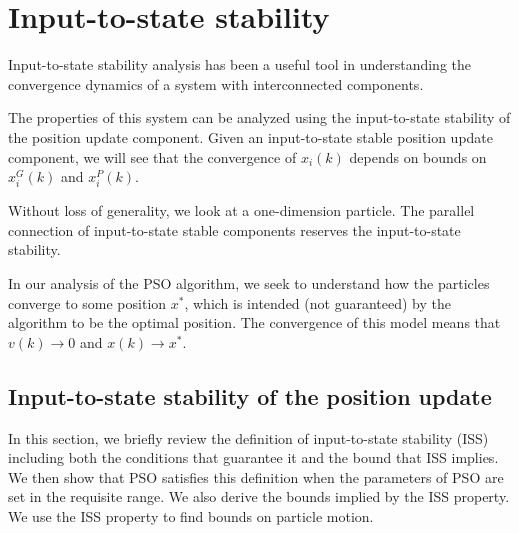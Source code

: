 \section{Input-to-state stability}
\label{sec:iss}


Input-to-state stability analysis has been a useful tool in understanding the convergence dynamics of a system with interconnected components.

The properties of this system can be analyzed using the input-to-state stability of the position update component. 
Given an input-to-state stable position update component, we will see that the convergence of $ x_{i}(k) $ depends on bounds on $ x^{G}_{i}(k) $ and $ x^{P}_{i}(k) $.

Without loss of generality, we look at a one-dimension particle.
The parallel connection of input-to-state stable components reserves the input-to-state stability.

In our analysis of the PSO algorithm, we seek to understand how the particles converge to some position $ x^{*} $, which is intended (not guaranteed) by the algorithm to be the optimal position.
The convergence of this model means that $ v(k) \rightarrow 0 $ and $ x(k) \rightarrow x^{*} $.

\subsection{Input-to-state stability of the position update}

In this section, we briefly review the definition of input-to-state stability (ISS) including both the conditions that guarantee it and the bound that ISS implies\cite{Jiang2001857}. 
We then show that PSO satisfies this definition when the parameters of PSO are set in the requisite range.
We also derive the bounds implied by the ISS property.
We use the ISS property to find bounds on particle motion.

